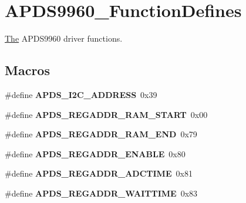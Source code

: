 \hypertarget{group__APDS9960__FunctionDefines}{}\section{A\+P\+D\+S9960\+\_\+\+Function\+Defines}
\label{group__APDS9960__FunctionDefines}


\hyperlink{structThe}{The} A\+P\+D\+S9960 driver functions.  


\subsection*{Macros}
\begin{DoxyCompactItemize}
\item 
\mbox{\label{group__APDS9960__FunctionDefines_gae02912f55ffa0394ecd41967424ca2b9}} 
\#define {\bfseries A\+P\+D\+S\+\_\+\+I2\+C\+\_\+\+A\+D\+D\+R\+E\+SS}~0x39
\item 
\mbox{\label{group__APDS9960__FunctionDefines_gad1eff5da8831e9b03b148e410c4da318}} 
\#define {\bfseries A\+P\+D\+S\+\_\+\+R\+E\+G\+A\+D\+D\+R\+\_\+\+R\+A\+M\+\_\+\+S\+T\+A\+RT}~0x00
\item 
\mbox{\label{group__APDS9960__FunctionDefines_ga62cbbbece7901acdf5e195a41697ce58}} 
\#define {\bfseries A\+P\+D\+S\+\_\+\+R\+E\+G\+A\+D\+D\+R\+\_\+\+R\+A\+M\+\_\+\+E\+ND}~0x79
\item 
\mbox{\label{group__APDS9960__FunctionDefines_gaec3b9e9c9c53c0d831c8e6b37a3ba5d3}} 
\#define {\bfseries A\+P\+D\+S\+\_\+\+R\+E\+G\+A\+D\+D\+R\+\_\+\+E\+N\+A\+B\+LE}~0x80
\item 
\mbox{\label{group__APDS9960__FunctionDefines_gaa04f4528baf99ccfb6a059f38d8c8f45}} 
\#define {\bfseries A\+P\+D\+S\+\_\+\+R\+E\+G\+A\+D\+D\+R\+\_\+\+A\+D\+C\+T\+I\+ME}~0x81
\item 
\mbox{\label{group__APDS9960__FunctionDefines_ga56489db81d45871a5efdda7d88177bad}} 
\#define {\bfseries A\+P\+D\+S\+\_\+\+R\+E\+G\+A\+D\+D\+R\+\_\+\+W\+A\+I\+T\+T\+I\+ME}~0x83
\item 

\end{DoxyCompactItemize}
